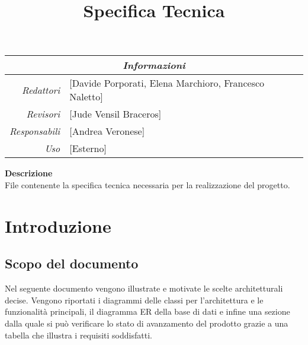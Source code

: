 \documentclass[12pt]{article}
\begin{document}
\setcounter{tocdepth}{4}
\setcounter{secnumdepth}{4}
\title{Specifica Tecnica}

\firstPage
\pagebreak

\maketitle

\begin{center}
    \begin{tabular}{r | l}
		\multicolumn{2}{c}{\textit{Informazioni}}\\
		\hline
		
			\textit{Redattori} &
			[Davide Porporati, Elena Marchioro, Francesco Naletto]\makecell{}\\

			\textit{Revisori} &
			[Jude Vensil Braceros]\makecell{}\\
			\textit{Responsabili} &
			[Andrea Veronese]\makecell{}\\
		      \textit{Uso} & 
                [Esterno]\makecell{}\\
    \end{tabular}
\end{center}

\begin{center}
    \textbf{Descrizione}\\
	File contenente la specifica tecnica necessaria per la realizzazione del progetto. 
\end{center}

\pagebreak
{}

\makeversioni

\tableofcontents

\pagebreak

\graphicspath{ {./UML/images/} }

\section{Introduzione}

\subsection{Scopo del documento}
Nel seguente documento vengono illustrate e motivate le scelte architetturali decise. Vengono riportati i diagrammi delle classi per l'architettura e le funzionalità principali,
il diagramma ER della base di dati e infine una sezione dalla quale si può verificare lo stato di avanzamento del prodotto grazie a una tabella che illustra
i requisiti soddisfatti.
\end{document}
